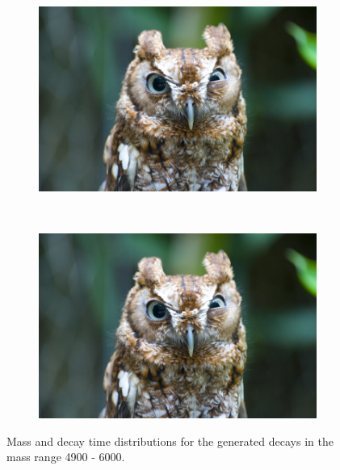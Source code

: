{\begin{figure}[htbp]
    \centering
   \begin{subfigure}[b]{0.48\textwidth}
        \includegraphics[width= \textwidth]{./Figs/placeholder.jpeg}
    \end{subfigure}
   ~ %
    \begin{subfigure}[b]{0.48\textwidth}
       \includegraphics[width=\textwidth]{./Figs/placeholder.jpeg}
   \end{subfigure}
    \caption{Mass and decay time distributions for the generated decays in the mass range 4900 - 6000.}
    \label{fig:toygen}
\end{figure}

}
